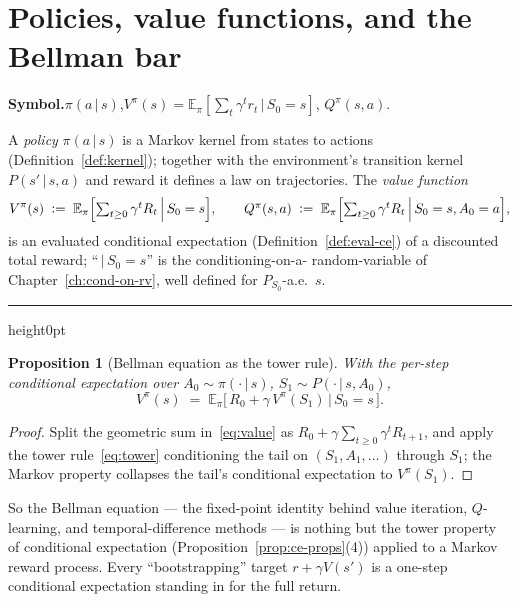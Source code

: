 \documentclass[11pt,oneside]{report}
\theoremstyle{plain}
\newtheorem{proposition}[theorem]{Proposition}
\theoremstyle{definition}
\theoremstyle{remark}
\newenvironment{mlentry}[1]%
  {\par\medskip\noindent\textbf{Symbol.}\quad #1\par\nobreak\smallskip}%
  {\par\medskip\hrule height0pt\medskip}
\newcommand{\E}{\mathbb{E}}
\newcommand{\defeq}{\vcentcolon=}
\newcommand{\given}{\,\vert\,}
\numberwithin{equation}{chapter}
\begin{document}
\section{Policies, value functions, and the Bellman bar}\label{sec:rl}

\begin{mlentry}{$\pi(a\given s)$,\quad $V^\pi(s)=\E_\pi[\sum_t\gamma^t r_t\given S_0=s]$,\quad
$Q^\pi(s,a)$.}
A \emph{policy} $\pi(a\given s)$ is a Markov kernel from states to actions
(Definition~\ref{def:kernel}); together with the environment's transition
kernel $P(s'\given s,a)$ and reward it defines a law on trajectories. The
\emph{value function}
\begin{equation}\label{eq:value}
  V^\pi(s)\;\defeq\;\E_\pi\Bigl[\textstyle\sum_{t\ge0}\gamma^t R_t
     \,\Big|\,S_0=s\Bigr],\qquad
  Q^\pi(s,a)\;\defeq\;\E_\pi\Bigl[\textstyle\sum_{t\ge0}\gamma^t R_t
     \,\Big|\,S_0=s,A_0=a\Bigr],
\end{equation}
is an evaluated conditional expectation (Definition~\ref{def:eval-ce}) of a
discounted total reward; ``$\given S_0=s$'' is the conditioning-on-a-
random-variable of Chapter~\ref{ch:cond-on-rv}, well defined for $P_{S_0}$-a.e.\ $s$.
\end{mlentry}

\begin{proposition}[Bellman equation as the tower rule]\label{prop:bellman}
With the per-step conditional expectation over $A_0\sim\pi(\cdot\given s)$,
$S_1\sim P(\cdot\given s,A_0)$,
\begin{equation}\label{eq:bellman}
  V^\pi(s)\;=\;\E_{\pi}\bigl[\,R_0+\gamma\,V^\pi(S_1)\,\big|\,S_0=s\,\bigr].
\end{equation}
\end{proposition}
\begin{proof}
Split the geometric sum in~\eqref{eq:value} as
$R_0+\gamma\sum_{t\ge0}\gamma^t R_{t+1}$, and apply the tower
rule~\eqref{eq:tower} conditioning the tail on $(S_1,A_1,\dots)$ through
$S_1$; the Markov property collapses the tail's conditional expectation to
$V^\pi(S_1)$.
\end{proof}

So the Bellman equation --- the fixed-point identity behind value
iteration, $Q$-learning, and temporal-difference methods --- is nothing but
the tower property of conditional expectation
(Proposition~\ref{prop:ce-props}(4)) applied to a Markov reward process.
Every ``bootstrapping'' target $r+\gamma V(s')$ is a one-step conditional
expectation standing in for the full return.
\end{document}
